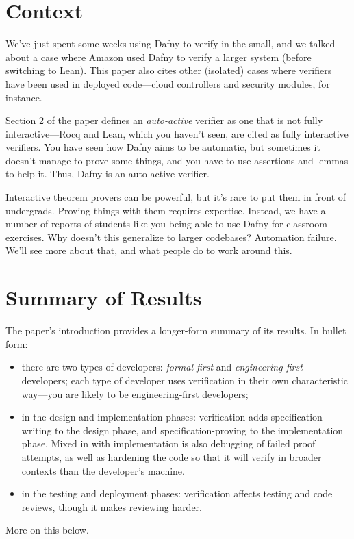 \documentclass[11pt]{article}
\begin{document}
\section*{Context}
We've just spent some weeks using Dafny to verify in the small, and we talked about a case where
Amazon used Dafny to verify a larger system (before switching to Lean). This paper also cites
other (isolated) cases where verifiers have been used in deployed code---cloud controllers and security modules,
for instance.

Section 2 of the paper defines an \emph{auto-active} verifier as one that is not fully interactive---Rocq and Lean,
which you haven't seen, are cited as fully interactive verifiers. You have seen how Dafny aims to be automatic,
but sometimes it doesn't manage to prove some things, and you have to use assertions and lemmas to help it. Thus,
Dafny is an auto-active verifier.

Interactive theorem provers can be powerful, but it's rare to put them in front of undergrads.
Proving things with them requires expertise. Instead, we have a number of reports of students
like you being able to use Dafny for classroom exercises. Why doesn't this generalize to larger codebases?
Automation failure. We'll see more about that, and what people do to work around this.

\section*{Summary of Results}
The paper's introduction provides a longer-form summary of its results. In bullet form:
\begin{itemize}[noitemsep]
\item there are two types of developers: \emph{formal-first} and \emph{engineering-first} developers; each type of developer uses verification in their own characteristic way---you are likely to be engineering-first developers;
\item in the design and implementation phases: verification adds specification-writing to the design phase, and specification-proving to the implementation phase. Mixed in with implementation is also debugging of failed proof attempts, as well as hardening the code so that it will verify in broader contexts than the developer's machine.
\item in the testing and deployment phases: verification affects testing and code reviews, though it makes reviewing harder.
\end{itemize}
More on this below.
\end{document}
